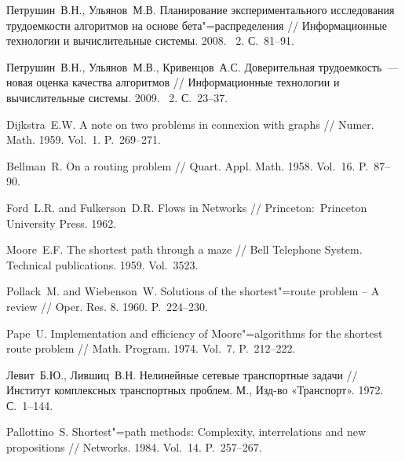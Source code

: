 \documentclass[a4paper,fontsize=14pt]{article}
\newcommand*{\No}{\textnumero}
\begin{document}
\begin{thebibliography}{1} \label{sec:sources}

	 Петрушин~В.\:Н., Ульянов~М.\:В. Планирование экспериментального исследования трудоемкости алгоритмов на основе бета"=распределения // Информационные технологии и вычислительные системы. 2008. \No~2. С.~81--91.
	
	 Петрушин~В.\:Н., Ульянов~М.\:В., Кривенцов~А.\:С. Доверительная трудоемкость~--- новая оценка качества алгоритмов // Информационные технологии и вычислительные системы. 2009. \No~2. С.~23--37.
		
	 Dijkstra~E.\:W. A note on two problems in connexion with graphs // Numer. Math. 1959. Vol.~1. P.~269--271.

	 Bellman~R. On a routing problem // Quart. Appl. Math. 1958. Vol.~16. P.~87--90.
	
	 Ford~L.\:R. and Fulkerson~D.\:R. Flows in Networks // Princeton:~Princeton University Press. 1962.
	
	 Moore~E.\:F. The shortest path through a maze // Bell Telephone System. Technical publications. 1959. Vol.~3523.
	
	 Pollack~M. and Wiebenson~W. Solutions of the shortest"=route problem – A review // Oper. Res. 8. 1960. P.~224--230.
	
	 Pape~U. Implementation and efficiency of Moore"=algorithms for the shortest route problem // Math. Program. 1974. Vol.~7. P.~212--222.
	
	 Левит~Б.\:Ю., Лившиц~В.\:Н. Нелинейные сетевые транспортные задачи // Институт комплексных транспортных проблем. М., Изд-во «Транспорт». 1972. С.~1--144.
	
	 Pallottino~S. Shortest"=path methods: Complexity, interrelations and new propositions // Networks. 1984. Vol.~14. P.~257--267.

\end{thebibliography}
\end{document}
